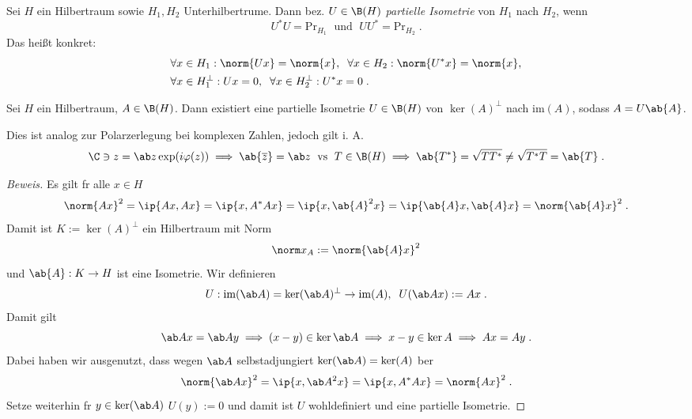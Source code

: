 \begin{definition}
	Sei $H$ ein Hilbertraum sowie \(H_1, H_2\) Unterhilbertr\as ume. Dann bez. \(U\in \B(H)\) \textit{partielle Isometrie} von $H_1$ nach $H_2$, wenn 
	\[U^*U = \text{Pr}_{H_1} \;\text{ und }\; UU^* = \text{Pr}_{H_2}\;.\]
	Das hei\ss{}t konkret:
	\begin{align*}&\forall x\in H_1: \norm{Ux} = \norm{x},\;\;\forall x \in H_2: \norm{U^*x} = \norm{x},\\
		&\forall x \in H_1^{\perp}: Ux = 0,\;\; \forall x \in H_2^\perp: U^*x = 0\;.\end{align*}
\end{definition}
\begin{theorem}
	Sei $H$ ein Hilbertraum, \(A\in \B(H)\). Dann existiert eine partielle Isometrie \(U\in \B(H)\) von \(\ker(A)^\perp \) nach \(\text{im}(A)\), sodass \(A = U \ab{A}\).
	\label{part_isom}
\end{theorem}
\begin{rem}
	Dies ist analog zur Polarzerlegung bei komplexen Zahlen, jedoch gilt i. A. 
	\[\C\ni z = \ab z \exp(i\varphi(z))\implies \ab{\overline z} = \ab z \;\text{ vs }\; T \in \B(H) \implies \ab{T^*} = \sqrt{TT^*} \neq \sqrt{T^*T} = \ab{T}\;.\]
\end{rem}
\begin{proof}[Beweis]
	Es gilt f\us r alle \(x\in H\)
	\[\norm{Ax}^2 = \ip{Ax, Ax} = \ip{x, A^*Ax} = \ip{x, \ab{A}^2 x} = \ip{\ab{A}x, \ab{A}x} = \norm{\ab{A}x}^2\;.\]
	Damit ist \(K:=\ker(A)^\perp\) ein Hilbertraum mit Norm 
	\[\norm x_A := \norm {\ab{A}x}^2\]
	und \(\ab{A}: K\to H\) ist eine Isometrie. Wir definieren
	\[U: \text{im}(\ab A) = \ker(\ab A)^\perp \to \text{im} (A),\;\; U(\ab A x ) := Ax\;.\]
	Damit gilt
	\[\ab A x = \ab A y \implies (x-y) \in \ker \ab A \implies x-y \in \ker A \implies Ax = Ay\;.\]
	Dabei haben wir ausgenutzt, dass wegen $\ab A$ selbstadjungiert \(\ker(\ab A) = \ker(A)\) \us ber
	\[\norm{\ab A x}^2 = \ip{x, \ab A^2 x} = \ip{x, A^*Ax}= \norm{Ax}^2\;. \]
	Setze weiterhin f\us r \(y\in \ker(\ab A)\)  \(U(y):=0\) und damit ist $U$ wohldefiniert und eine partielle Isometrie.
\end{proof}

